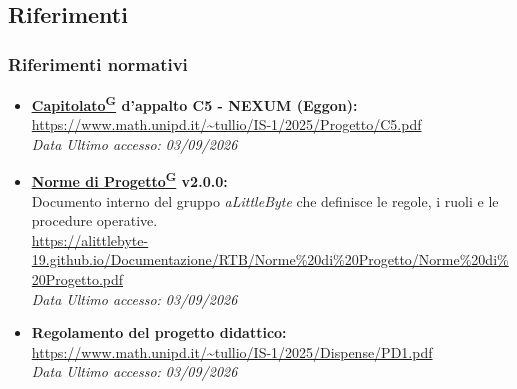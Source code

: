 ﻿\documentclass[a4paper,12pt]{article}
\providecommand{\glslink}[2]{\href{https://alittlebyte-19.github.io/Documentazione/glossario.html\#gls-#1}{\underline{#2}\textsuperscript{\scriptsize G}}}
\begin{document}
\subsection{Riferimenti}
\subsubsection{Riferimenti normativi}
\begin{itemize}
    \item \textbf{\glslink{capitolato}{Capitolato} d'appalto C5 - NEXUM (Eggon):}\\
    \url{https://www.math.unipd.it/~tullio/IS-1/2025/Progetto/C5.pdf}\\
    \textit{Data Ultimo accesso: 03/09/2026}

    \item \textbf{\glslink{norme-di-progetto}{Norme di Progetto} v2.0.0:}\\
    Documento interno del gruppo \textit{aLittleByte} che definisce le regole, i ruoli e le procedure operative.\\
    \url{https://alittlebyte-19.github.io/Documentazione/RTB/Norme%20di%20Progetto/Norme%20di%20Progetto.pdf}\\
    \textit{Data Ultimo accesso: 03/09/2026}

    \item \textbf{Regolamento del progetto didattico:}\\
    \url{https://www.math.unipd.it/~tullio/IS-1/2025/Dispense/PD1.pdf}\\
    \textit{Data Ultimo accesso: 03/09/2026}
\end{itemize}
\end{document}
